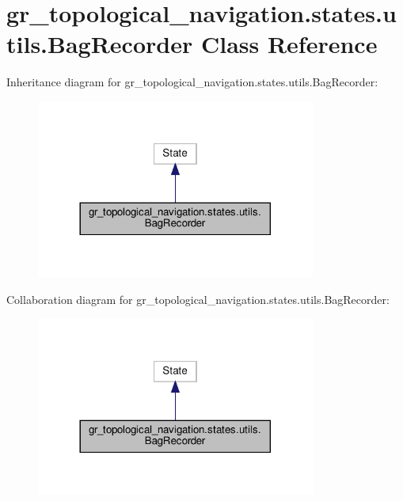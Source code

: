 \hypertarget{classgr__topological__navigation_1_1states_1_1utils_1_1BagRecorder}{}\section{gr\+\_\+topological\+\_\+navigation.\+states.\+utils.\+Bag\+Recorder Class Reference}
\label{classgr__topological__navigation_1_1states_1_1utils_1_1BagRecorder}


Inheritance diagram for gr\+\_\+topological\+\_\+navigation.\+states.\+utils.\+Bag\+Recorder\+:
\nopagebreak
\begin{figure}[H]
\begin{center}
\leavevmode
\includegraphics[width=260pt]{classgr__topological__navigation_1_1states_1_1utils_1_1BagRecorder__inherit__graph}
\end{center}
\end{figure}


Collaboration diagram for gr\+\_\+topological\+\_\+navigation.\+states.\+utils.\+Bag\+Recorder\+:
\nopagebreak
\begin{figure}[H]
\begin{center}
\leavevmode
\includegraphics[width=260pt]{classgr__topological__navigation_1_1states_1_1utils_1_1BagRecorder__coll__graph}
\end{center}
\end{figure}
